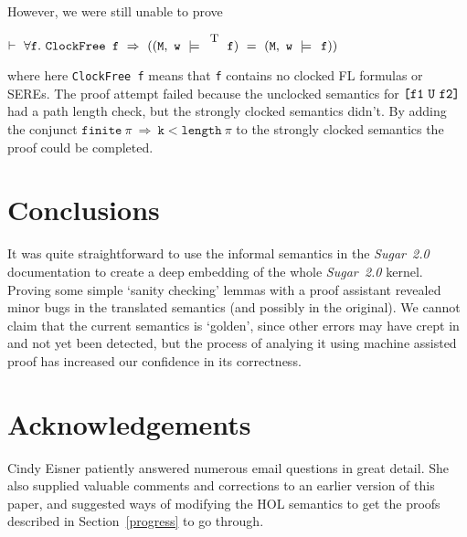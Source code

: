 \documentclass{llncs}
\newcommand{\T}{\texttt{\small\rm{T}}}
\newcommand{\sSem}[4]{(\tt{#1,~#2~\models^{\hspace*{-2.3mm}\raisebox{1mm}{\tt#3}}~#4})}
\renewcommand{\c}{{\hspace*{2.5mm}}}
\newcommand{\fUntil}[2]{\texttt{[}#1~\texttt{U}~#2\texttt{]}}
\newcommand\Sugar{{\it{Sugar~2.0}}\xspace}
\renewcommand{\t}[1]{\texttt{#1}}
\begin{document}
\medskip

However, we were still unable to prove

\medskip

$\vdash~\forall{\t{f}}.~\t{ClockFree~f}~\Rightarrow~(\sSem{M}{w}{\T}{f}~=~\sSem{M}{w}{\c}{f})$

\medskip
where here \t{ClockFree~f} means that \t{f} contains no clocked FL formulas or SEREs.
The proof attempt failed because the unclocked semantics for $\tt{\fUntil{f1}{f2}}$ 
had a path length check, but the strongly clocked semantics didn't. By adding the conjunct
$\t{finite}~\pi~\Rightarrow~\t{k}<\t{length}~\pi$ to the strongly clocked semantics
the proof could be completed.

\section{Conclusions}

It was quite straightforward to use the informal semantics in the
\Sugar documentation to create a deep
embedding of the whole \Sugar kernel.  Proving some simple `sanity
checking' lemmas with a proof assistant revealed minor bugs in the
translated semantics (and possibly in the original). We cannot claim
that the current semantics is `golden', since other errors may have
crept in and not yet been detected, but the process of analying it
using machine assisted proof has increased our confidence in its
correctness.

\section{Acknowledgements}

Cindy Eisner patiently answered numerous email questions
in great detail. She also supplied valuable comments and corrections
to an earlier version of this paper, and suggested
ways of modifying the HOL semantics to get the proofs described in Section~\ref{progress} to go through.

{}
\end{document}
